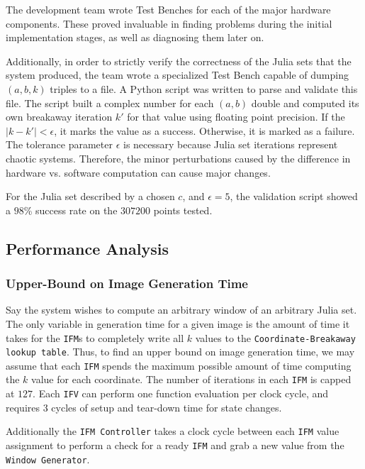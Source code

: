 \documentclass{article}
\begin{document}
The development team wrote Test Benches for each of the major hardware components. These proved invaluable in 
finding problems during the initial implementation stages, as well as diagnosing them later on. 

Additionally, in order to strictly verify the correctness of the Julia sets that the system produced, the team wrote a 
specialized Test Bench capable of dumping $(a, b, k)$  triples to a file. A Python
script was written to parse and validate this file. The script built a complex number for each $(a, b)$ double 
and computed its own breakaway iteration $k'$ for that value using floating point precision. If the $|k-k'|<\epsilon$, 
it marks the value as a success. Otherwise, it is marked as a failure. The tolerance parameter $\epsilon$ is necessary
because Julia set iterations represent chaotic systems. Therefore, the minor perturbations caused by the difference
in hardware vs. software computation can cause major changes.

For the Julia set described by a chosen $c$, and $\epsilon = 5$, the validation script showed a $98$\% success rate on
the $307200$ points tested.

\subsection{Performance Analysis}

\subsubsection{Upper-Bound on Image Generation Time}

Say the system wishes to compute an arbitrary window of an arbitrary Julia set. The only variable in generation time for a given
image is the amount of time it takes for the \texttt{IFM}s to completely write all $k$ values to the \texttt{Coordinate-Breakaway lookup table}. Thus, to find an upper bound on image generation time, we may assume that
each \texttt{IFM} spends the maximum possible amount of time computing the $k$ value for each coordinate. The 
number of iterations in each \texttt{IFM} is capped at $127$. Each \texttt{IFV} can perform one function evaluation
per clock cycle, and requires $3$ cycles of setup and tear-down time for state changes. 

Additionally the \texttt{IFM Controller} takes a clock cycle between each \texttt{IFM} value assignment to perform a check for a ready \texttt{IFM} and grab a new value from the \texttt{Window Generator}. 
\end{document}
